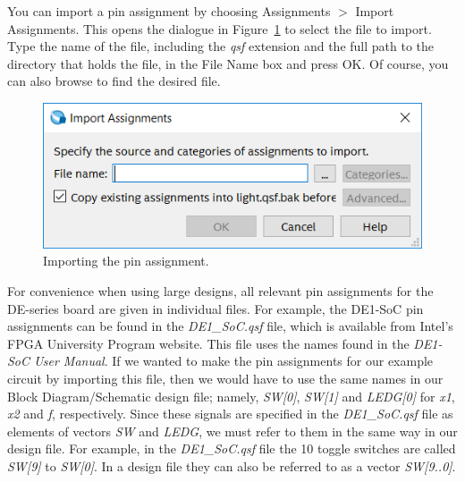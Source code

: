 \documentclass[11pt, twoside, pdftex]{article}
\begin{document}
You can import a pin assignment by choosing {\sf Assignments $>$ Import Assignments}. 
This opens the dialogue in Figure~\ref{fig:29} to select the file to import. 
Type the name of the file, including the {\it qsf} extension and the full path
to the directory that holds the file, in the File Name box and press {\sf OK}.
Of course, you can also browse to find the desired file.
 
\begin{figure}[H]
   \begin{center}
      \includegraphics[scale=0.6]{figures/figure29.png}
   \caption{Importing the pin assignment.} 
	 \label{fig:29}
	 \end{center}
\end{figure}

For convenience when using large designs, all relevant pin assignments for the 
DE-series board are given in individual files. For example, the DE1-SoC pin assignments 
can be found in the {\it DE1\_SoC.qsf} file, which is available from Intel's FPGA University
Program website.
This file uses the names found in the {\it DE1-SoC User Manual}.
If we wanted to make the pin assignments for our example circuit by importing
this file, then we would have to use the same names in our 
Block Diagram/Schematic design file;
namely, {\it SW[0]}, {\it SW[1]} and {\it LEDG[0]} for 
{\it x1}, {\it x2} and {\it f}, respectively.
Since these signals are specified in the {\it DE1\_SoC.qsf} file
as elements of vectors {\it SW} and {\it LEDG}, we must refer to them in the same
way in our design file. For example, in the {\it DE1\_SoC.qsf} 
file the 10 toggle switches are called {\it SW[9]} to {\it SW[0]}.
In a design file they can also be referred to as a vector {\it SW[9..0]}.


\newpage






\end{document}
